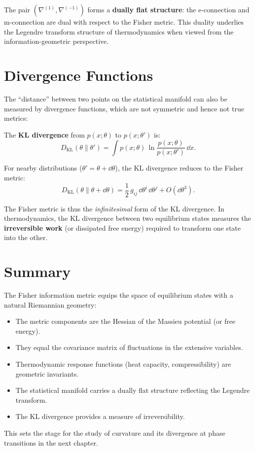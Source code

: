 The pair $(\nabla^{(1)}, \nabla^{(-1)})$ forms a \textbf{dually flat structure}: the e-connection and m-connection are dual with respect to the Fisher metric. This duality underlies the Legendre transform structure of thermodynamics when viewed from the information-geometric perspective.

\section{Divergence Functions}

The ``distance'' between two points on the statistical manifold can also be measured by divergence functions, which are not symmetric and hence not true metrics:

\begin{definition}
The \textbf{KL divergence} from $p(x; \theta)$ to $p(x; \theta')$ is:
\begin{equation}
D_{\text{KL}}(\theta \| \theta') = \int p(x; \theta)\,\ln\frac{p(x;\theta)}{p(x;\theta')}\,\dd x.
\end{equation}
\end{definition}

For nearby distributions ($\theta' = \theta + \dd\theta$), the KL divergence reduces to the Fisher metric:
\begin{equation}
D_{\text{KL}}(\theta \| \theta + \dd\theta) = \frac{1}{2}\,g_{ij}\,\dd\theta^i\,\dd\theta^j + O(\dd\theta^3).
\end{equation}

The Fisher metric is thus the \emph{infinitesimal} form of the KL divergence. In thermodynamics, the KL divergence between two equilibrium states measures the \textbf{irreversible work} (or dissipated free energy) required to transform one state into the other.

\section{Summary}

The Fisher information metric equips the space of equilibrium states with a natural Riemannian geometry:
\begin{itemize}
\item The metric components are the Hessian of the Massieu potential (or free energy).
\item They equal the covariance matrix of fluctuations in the extensive variables.
\item Thermodynamic response functions (heat capacity, compressibility) are geometric invariants.
\item The statistical manifold carries a dually flat structure reflecting the Legendre transform.
\item The KL divergence provides a measure of irreversibility.
\end{itemize}

This sets the stage for the study of curvature and its divergence at phase transitions in the next chapter.
